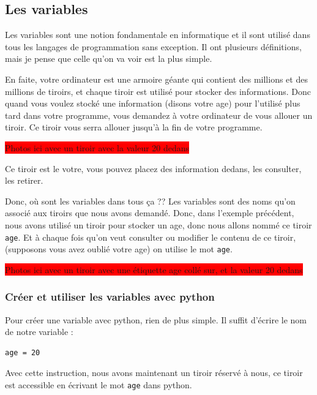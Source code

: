 \documentclass[12pt]{article}
\newcommand{\code}[1]{\colorbox{light-gray}{\texttt{#1}}}
\begin{document}
\clearpage

    \subsection{Les variables}
        Les variables sont une notion fondamentale en informatique et il sont utilisé dans tous les langages
        de programmation sans exception. Il ont plusieurs définitions, mais je pense que celle qu'on va voir est la plus simple.

        En faite, votre ordinateur est une armoire géante qui contient des millions et des millions de tiroirs, et
        chaque tiroir 
        est utilisé pour stocker des informations. Donc quand vous voulez stocké une information (disons votre age) 
        pour l'utilisé plus tard dans votre programme, vous demandez à votre ordinateur de vous allouer un tiroir. 
        Ce tiroir vous serra allouer jusqu'à la fin de votre programme.

        \colorbox{red}{Photos ici avec un tiroir avec la valeur 20 dedans}

        Ce tiroir est le votre, vous pouvez placez des information dedans, les consulter, les retirer.


        Donc, où sont les variables dans tous ça ?? Les variables sont des noms qu'on associé aux tiroirs que nous 
        avons demandé. Donc, dans l'exemple précédent, nous avons utilisé un tiroir pour stocker un age, donc nous 
        allons nommé ce tiroir \code{age}. Et à chaque fois qu'on veut consulter ou modifier le contenu de ce tiroir, 
        (supposons vous avez oublié votre age) on utilise le mot \code{age}.

        \colorbox{red}{Photos ici avec un tiroir avec une étiquette age collé sur, et la valeur 20 dedans}

        \subsubsection{Créer et utiliser les variables avec python}
            Pour créer une variable avec python, rien de plus simple. Il suffit d'écrire le nom de notre variable :
            \begin{lstlisting}[style=code]
age = 20 
            \end{lstlisting}

            Avec cette instruction, nous avons maintenant un tiroir réservé à nous, ce tiroir est accessible en
            écrivant le mot \code{age} dans python. 
\end{document}
